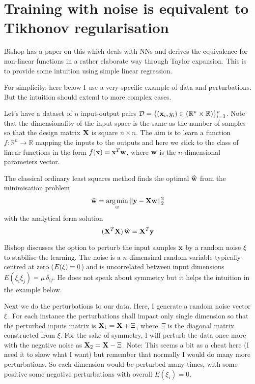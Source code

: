 
\clearpage

\section{Training with noise is equivalent to Tikhonov regularisation}

Bishop has a paper on this \cite{Bishop1995} which deals with NNs and derives the equivalence for non-linear functions in a rather elaborate way through Taylor expansion.
This is to provide some intuition using simple linear regression.

For simplicity, here below I use a very specific example of data and perturbations. But the intuition should extend to more complex cases.

Let's have a dataset of $n$ input-output pairs $\mathcal{D} = \{ (\mathbf{x}_i,y_i) \in (\mathbb{R}^n \times \mathbb{R}) \}_{i=1}^n$. Note that the dimensionality of the input space is the same as the number of samples so that the design matrix $\mathbf{X}$ is square $n \times n$. The aim is to learn a function $f : \mathbb{R}^n \to \mathbb{R}$ mapping the inputs to the outputs and here we stick to the class of linear functions in the form $f(\mathbf{x}) = \mathbf{x}^T \mathbf{w}$, where $\mathbf{w}$ is the $n$-dimensional parameters vector.

The classical ordinary least squares method finds the optimal $\mathbf{\widehat{w}}$ from the minimisation problem
\begin{equation}
\mathbf{\widehat{w}} = \operatorname*{arg\,min}_w ||\mathbf{y} - \mathbf{X}\mathbf{w}||_2^2
\end{equation} 
with the analytical form solution 
\begin{equation}
( \mathbf{X}^T \mathbf{X} ) \, \mathbf{\widehat{w}} =  \mathbf{X}^T \mathbf{y}
\end{equation}

Bishop discusses the option to perturb the input samples $\mathbf{x}$ by a random noise $\mathbf{\xi}$ to stabilise the learning. The noise is a $n$-dimensinal random variable typically centred at zero ($E(\mathbf{\xi}) = 0$) and is uncorrelated between input dimensions $E(\xi_i \xi_j) = \mu \, \delta_{ij}$. He does not speak about symmetry but it helps the intuition in the example below.

Next we do the perturbations to our data. Here, I generate a random noise vector $\mathbf{\xi}$. For each instance the perturbations shall impact only single dimension so that the perturbed inputs matrix is $\mathbf{X}_1 = \mathbf{X} +\Xi$, where $\Xi$ is the diagonal matrix constructed from $\xi$. For the sake of symmetry, I will perturb the data once more with the negative noise as $\mathbf{X}_2 = \mathbf{X} - \Xi$. Note: This seems a bit as a cheat here (I need it to show what I want) but remember that normally I would do many more perturbations. So each dimension would be perturbed many times, with some positive some negative perturbations with overall $E(\xi_i) = 0$.

